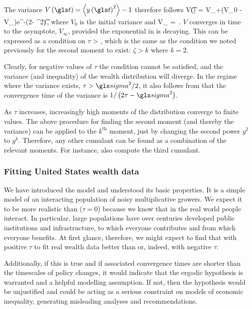 The variance $V\left(\t\right)=\ave{y\left(\t\right)^2}-1$ therefore follows
\be
V\left(\t\right) = V_{\infty}+\left(V_0 - V_{\infty}\right)e^{-\left(2\tau - \gsigma^2\right)\t}\,,
\ee
where $V_0$ is the initial variance and
\be
V_{\infty} = \,.
\ee
$V$ converges in time to the asymptote, $V_{\infty}$, provided the exponential in  is decaying. 
This can be expressed as a condition on $\tau$
\be
\tau > ,
\ee
which is the same as the condition we noted previously for the second moment to exist: $\zeta>k$ where $k=2$.

Clearly, for negative values of $\tau$ the condition cannot be satisfied, and the variance (and inequality) of the wealth distribution will diverge. In the regime where the variance exists, $\tau > \gsigma^2/2$, it also follows from  that the convergence time of the variance is $1/\left(2\tau - \gsigma^2\right)$.

As $\tau$ increases, increasingly high moments of the distribution converge to finite values. The above procedure for finding the second moment (and thereby the variance) can be applied to the $k^\text{th}$ moment, just by changing the second power $y^2$ to $y^k$. Therefore, any other cumulant can be found as a combination of the relevant moments. For instance, \cite{LiuSerota2016} also compute the third cumulant.


\subsubsection{Fitting United States wealth data}
We have introduced the \RGBM model and understood its basic properties. It is a simple model of an interacting population of noisy multiplicative growers. We expect it to be more realistic than \GBM ($\tau=0$) because we know that in the real world people interact. In particular, large populations have over centuries developed public institutions and infrastructure, to which everyone contributes and from which everyone benefits. At first glance, therefore, we might expect to find that \RGBM with positive $\tau$ to fit real wealth data better than \GBM or, indeed, \RGBM with negative $\tau$.

Additionally, if this is true and if associated convergence times are shorter than the timescales of policy changes, it would indicate that the ergodic hypothesis is warranted and a helpful modelling assumption. If not, then the hypothesis would be unjustified and could be acting as a serious constraint on models of economic inequality, generating misleading analyses and recommendations.

